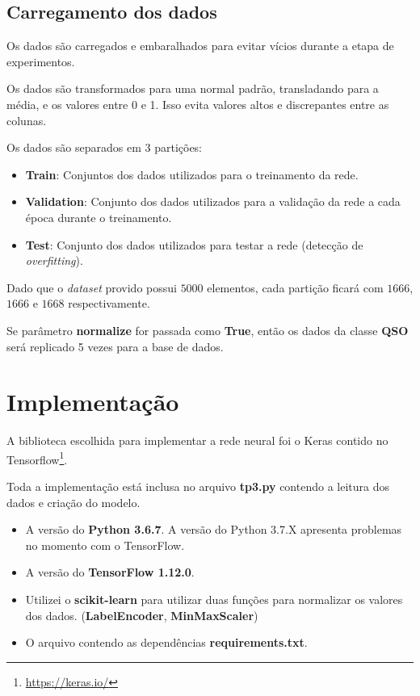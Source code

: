\subsection{Carregamento dos dados}

Os dados são carregados e embaralhados para evitar vícios durante a etapa de experimentos.

Os dados são transformados para uma normal padrão, transladando para a média, e os valores entre 0 e 1. Isso evita valores altos e discrepantes entre as colunas.

Os dados são separados em 3 partições:

\begin{itemize}
    \item \textbf{Train}: Conjuntos dos dados utilizados para o treinamento da rede.
    \item \textbf{Validation}: Conjunto dos dados utilizados para a validação da rede a cada época durante o treinamento.
    \item \textbf{Test}: Conjunto dos dados utilizados para testar a rede (detecção de \textit{overfitting}).
\end{itemize}

Dado que o \textit{dataset} provido possui $5000$ elementos, cada partição ficará com $1666$, $1666$ e $1668$ respectivamente.

Se parâmetro \textbf{normalize} for passada como \textbf{True}, então os dados da classe \textbf{QSO} será replicado 5 vezes para a base de dados.

\section{Implementação}

A biblioteca escolhida para implementar a rede neural foi o Keras contido no Tensorflow\footnote{\url{https://keras.io/}}.

Toda a implementação está inclusa no arquivo \textbf{tp3.py} contendo a leitura dos dados e criação do modelo.

\begin{itemize}
    \item A versão do \textbf{Python 3.6.7}. A versão do Python 3.7.X apresenta problemas no momento com o TensorFlow.
    \item A versão do \textbf{TensorFlow 1.12.0}.
    \item Utilizei o \textbf{scikit-learn} para utilizar duas funções para normalizar os valores dos dados. (\textbf{LabelEncoder}, \textbf{MinMaxScaler})
    \item O arquivo contendo as dependências \textbf{requirements.txt}.
\end{itemize}

